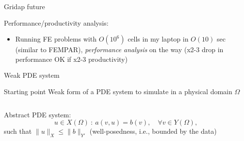 \begin{frame}{Gridap future}

Performance/productivity analysis:
\begin{itemize}
  \item Running FE problems with $O(10^6)$ cells in my laptop in $O(10)$ sec (similar to FEMPAR), \emph{performance analysis} on the way (x2-3 drop in performance OK if x2-3 productivity)
\end{itemize}

\end{frame}



\newcommand{\grad}{\boldsymbol{\nabla}}
\def\u{\boldsymbol{u}}
\def\v{\boldsymbol{v}}
\def\H{\boldsymbol{H}}
\def\b{\boldsymbol{b}}

\begin{frame}{Weak PDE system}
  \begin{block}{Starting point} {Weak form of a PDE} system to simulate in a physical domain $\Omega$
  \end{block}

  \vspace{1cm}



  \begin{columns}
    \begin{column}{0.65\textwidth}

      \begin{overprint}

%

Abstract PDE system:
$$
u \in X(\Omega) \ : \ a(v,u) = b(v), \quad \forall v \in Y(\Omega),
$$
such that $\| u \|_X \leq \| b \|_{Y'}$ (well-posedness, i.e., bounded by the data)

\vspace{0.1cm}


\end{overprint}
\end{column}
\end{columns}
\end{frame}
